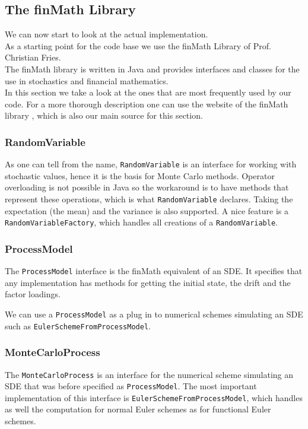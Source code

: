 \documentclass[12pt]{article}
\begin{document}
	
	\subsection{The finMath Library}
	We can now start to look at the actual implementation.\\
	As a starting point for the code base we use the finMath Library of Prof. Christian Fries.\\
	The finMath library is written in Java and provides interfaces and classes for the use in stochastics and financial mathematics.\\
	In this section we take a look at the ones that are most frequently used by our code. For a more thorough description one can use the website of the finMath library \cite{finmathWebsite}, which is also our main source for this section.
	
	\subsubsection*{RandomVariable}
	As one can tell from the name, \texttt{RandomVariable} is an interface for working with stochastic values, hence it is the basis for Monte Carlo methods. Operator overloading is not possible in Java so the workaround is to have methods that represent these operations, which is what \texttt{RandomVariable} declares.
	Taking the expectation (the mean) and the variance is also supported. A nice feature is a \texttt{RandomVariableFactory}, which handles all creations of a \texttt{RandomVariable}.
	
	\subsubsection*{ProcessModel}
	The \texttt{ProcessModel} interface is the finMath equivalent of an SDE. It specifies that any implementation has methods for getting the initial state, the drift and the factor loadings.
	
	
	
	We can use a \texttt{ProcessModel} as a plug in to numerical schemes simulating an SDE such as \texttt{EulerSchemeFromProcessModel}.
	
	\subsubsection*{MonteCarloProcess}
	The \texttt{MonteCarloProcess} is an interface for the numerical scheme simulating an SDE that was before specified as \texttt{ProcessModel}. The most important implementation of this interface is \texttt{EulerSchemeFromProcessModel}, which handles as well the computation for normal Euler schemes as for functional Euler schemes.
	
\end{document}
